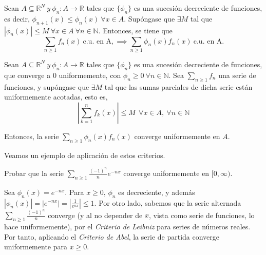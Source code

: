 \begin{nth} \label{11} Sean $ A \subseteq \mathbb{R}^N\  y \ \phi_n : A \rightarrow \mathbb{R}$ tales que $\{\phi_n\}$ es una sucesión decreciente de funciones, es decir, $\phi_{n+1}(x) \leq \phi_n (x)\ \forall x \in A.$ Supóngase que $\exists M$ tal que $|\phi_n (x)| \leq M\ \forall x \in A\ \forall n \in \mathbb{N}.$ Entonces, se tiene que
	$$\sum_{n \ge 1} f_n(x)\ \text{c.u. en A}, \implies \sum_{n \ge 1} \phi_n(x) f_n(x)\ \text{c.u. en A.}$$
\end{nth}

\begin{nth} \label{12} Sean $A \subseteq \mathbb{R}^N\  y \ \phi_n : A \rightarrow \mathbb{R}$ tales que $\{\phi_n\}$ es una sucesión decreciente de funciones, que converge a 0 uniformemente, con $\phi_n \ge 0 \ \forall n \in \mathbb{N}$. Sea $\sum_{n \ge 1} f_n$ una serie de funciones, y supóngase que $\exists M$ tal que las sumas parciales de dicha serie están uniformemente acotadas, esto es, $$\left| \sum_{k=1}^n f_k(x) \right| \le M \ \ \forall x \in A, \ \forall n \in \mathbb{N}$$

  Entonces, la serie $\displaystyle \sum_{n\ge 1} \phi_n(x)f_n(x)$ converge uniformemente en $A$.

\end{nth}


Veamos un ejemplo de aplicación de estos criterios.

\begin{ejemplo}
  Probar que la serie $\displaystyle \sum_{n \ge 1} \frac{(-1)^n}{n} e^{-nx}$ converge uniformemente en $[0, \infty)$.

  Sea $\phi_n(x) = e^{-nx}$. Para $x \ge 0$, $\phi_n$ es decreciente, y además $|\phi_n(x)| = | e^{-nx} |  = |\frac{1}{e^{nx}} |\le 1$. Por otro lado, sabemos que la serie alternada $ \sum_{n \ge 1} \frac{(-1)^n}{n}$ converge (y al no depender de $x$, vista como serie de funciones, lo hace uniformemente), por el \textit{Criterio de Leibniz} para series de números reales. Por tanto, aplicando el \textit{Criterio de Abel}, la serie de partida converge uniformemente para $x \ge 0$.
\end{ejemplo}



